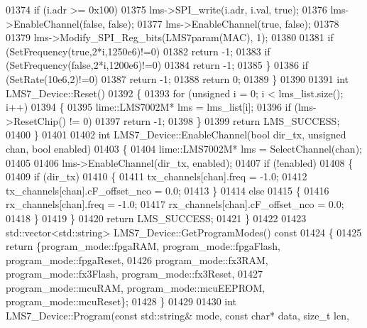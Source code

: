 \begin{DoxyCode}
{{{01374             \textcolor{keywordflow}{if} (i.adr >= 0x100)
01375                 lms->SPI_write(i.adr, i.val, \textcolor{keyword}{true});
01376         lms->EnableChannel(\textcolor{keyword}{false}, \textcolor{keyword}{false});
01377         lms->EnableChannel(\textcolor{keyword}{true}, \textcolor{keyword}{false});
01378 
01379         lms->Modify_SPI_Reg_bits(LMS7param(MAC), 1);
01380 
01381         \textcolor{keywordflow}{if} (SetFrequency(\textcolor{keyword}{true},2*i,1250e6)!=0)
01382             \textcolor{keywordflow}{return} -1;
01383         \textcolor{keywordflow}{if} (SetFrequency(\textcolor{keyword}{false},2*i,1200e6)!=0)
01384             \textcolor{keywordflow}{return} -1;
01385     \}
01386     \textcolor{keywordflow}{if} (SetRate(10e6,2)!=0)
01387         \textcolor{keywordflow}{return} -1;
01388     \textcolor{keywordflow}{return} 0;
01389 \}
01390 
01391 \textcolor{keywordtype}{int} LMS7_Device::Reset()
01392 \{
01393     \textcolor{keywordflow}{for} (\textcolor{keywordtype}{unsigned} i = 0; i < lms_list.size(); i++)
01394     \{
01395         lime::LMS7002M* lms = lms_list[i];
01396         \textcolor{keywordflow}{if} (lms->ResetChip() != 0)
01397             \textcolor{keywordflow}{return} -1;
01398     \}
01399     \textcolor{keywordflow}{return} LMS_SUCCESS;
01400 \}
01401 
01402 \textcolor{keywordtype}{int} LMS7_Device::EnableChannel(\textcolor{keywordtype}{bool} dir_tx, \textcolor{keywordtype}{unsigned} chan, \textcolor{keywordtype}{bool} enabled)
01403 \{
01404     lime::LMS7002M* lms = SelectChannel(chan);
01405 
01406     lms->EnableChannel(dir\_tx, enabled);
01407     \textcolor{keywordflow}{if} (!enabled)
01408     \{
01409         \textcolor{keywordflow}{if} (dir\_tx)
01410         \{
01411             tx_channels[chan].freq = -1.0;
01412             tx_channels[chan].cF\_offset\_nco = 0.0;
01413         \}
01414         \textcolor{keywordflow}{else}
01415         \{
01416             rx_channels[chan].freq = -1.0;
01417             rx_channels[chan].cF\_offset\_nco = 0.0;
01418         \}
01419     \}
01420     \textcolor{keywordflow}{return} LMS_SUCCESS;
01421 \}
01422 
01423 std::vector<std::string> LMS7_Device::GetProgramModes()\textcolor{keyword}{ const}
01424 \textcolor{keyword}{}\{
01425     \textcolor{keywordflow}{return} \{program_mode::fpgaRAM, program_mode::fpgaFlash, 
      program_mode::fpgaReset,
01426             program_mode::fx3RAM, program_mode::fx3Flash, program_mode::fx3Reset,
01427             program_mode::mcuRAM, program_mode::mcuEEPROM, 
      program_mode::mcuReset\};
01428 \}
01429 
01430 \textcolor{keywordtype}{int} LMS7_Device::Program(\textcolor{keyword}{const} std::string& mode, \textcolor{keyword}{const} \textcolor{keywordtype}{char}* data, \textcolor{keywordtype}{size\_t} len, 
}}}
\end{DoxyCode}
